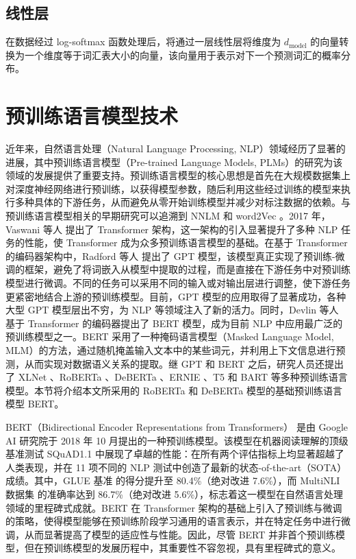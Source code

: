 \subsection{线性层}

在数据经过 log-softmax 函数处理后，将通过一层线性层将维度为 \(d_{\text{model}}\) 的向量转换为一个维度等于词汇表大小的向量，该向量用于表示对下一个预测词汇的概率分布。

\section{预训练语言模型技术}

近年来，自然语言处理（Natural Language Processing, NLP）领域经历了显著的进展，其中预训练语言模型（Pre-trained Language Models, PLMs）的研究为该领域的发展提供了重要支持。预训练语言模型的核心思想是首先在大规模数据集上对深度神经网络进行预训练，以获得模型参数，随后利用这些经过训练的模型来执行多种具体的下游任务，从而避免从零开始训练模型并减少对标注数据的依赖。与预训练语言模型相关的早期研究可以追溯到 NNLM \cite{NNLM} 和 word2Vec \cite{mikolov2013efficientestimationwordrepresentations}。2017 年，Vaswani 等人 \cite{transformer} 提出了 Transformer 架构，这一架构的引入显著提升了多种 NLP 任务的性能，使 Transformer 成为众多预训练语言模型的基础。在基于 Transformer 的编码器架构中，Radford 等人 \cite{gpt} 提出了 GPT 模型，该模型真正实现了预训练-微调的框架，避免了将词嵌入从模型中提取的过程，而是直接在下游任务中对预训练模型进行微调。不同的任务可以采用不同的输入或对输出层进行调整，使下游任务更紧密地结合上游的预训练模型。目前，GPT 模型的应用取得了显著成功，各种大型 GPT 模型层出不穷，为 NLP 等领域注入了新的活力。同时，Devlin 等人 \cite{devlin_bert_2019} 基于 Transformer 的编码器提出了 BERT 模型，成为目前 NLP 中应用最广泛的预训练模型之一。BERT 采用了一种掩码语言模型（Masked Language Model, MLM）的方法，通过随机掩盖输入文本中的某些词元，并利用上下文信息进行预测，从而实现对数据语义关系的提取。继 GPT 和 BERT 之后，研究人员还提出了 XLNet \cite{XLNet}、RoBERTa \cite{liu_roberta_2019}、DeBERTa \cite{he_deberta_2021}、ERNIE \cite{sun2019ernieenhancedrepresentationknowledge}、T5 \cite{T5} 和 BART \cite{lewis-etal-2020-bart} 等多种预训练语言模型。本节将介绍本文所采用的 RoBERTa 和 DeBERTa 模型的基础预训练语言模型 BERT。

BERT（Bidirectional Encoder Representations from Transformers）\cite{devlin_bert_2019} 是由 Google AI 研究院于 2018 年 10 月提出的一种预训练模型。该模型在机器阅读理解的顶级基准测试 SQuAD1.1 \cite{rajpurkar2016squad100000questionsmachine} 中展现了卓越的性能：在所有两个评估指标上均显著超越了人类表现，并在 11 项不同的 NLP 测试中创造了最新的状态-of-the-art（SOTA）成绩。其中，GLUE 基准 \cite{wang2019gluemultitaskbenchmarkanalysis} 的得分提升至 80.4\%（绝对改进 7.6\%），而 MultiNLI 数据集 \cite{williams2018broadcoveragechallengecorpussentencemultinli} 的准确率达到 86.7\%（绝对改进 5.6\%），标志着这一模型在自然语言处理领域的里程碑式成就。BERT 在 Transformer 架构的基础上引入了预训练与微调的策略，使得模型能够在预训练阶段学习通用的语言表示，并在特定任务中进行微调，从而显著提高了模型的适应性与性能。因此，尽管 BERT 并非首个预训练模型，但在预训练模型的发展历程中，其重要性不容忽视，具有里程碑式的意义。

